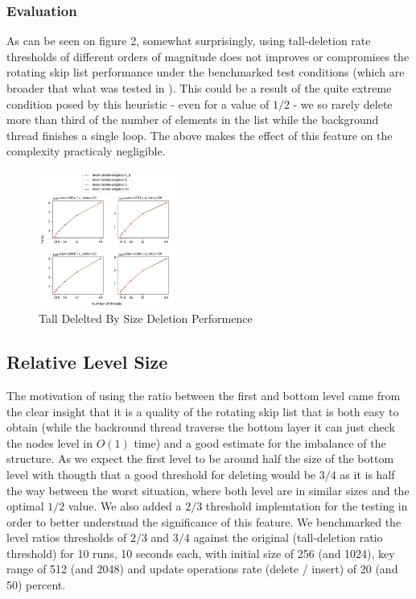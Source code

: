 \documentclass{article}
\begin{document}
\subsubsection{Evaluation}
\label{sssec:tds-evl}

As can be seen on figure 2, somewhat surprisingly, using tall-deletion rate thresholds of different orders of magnitude does not improves or compromises the rotating skip list performance under the benchmarked test conditions (which are broader that what was tested in \cite{C1}). This could be a result of the quite extreme condition posed by this heuristic - even for a value of $1/2$ - we so rarely delete more than third of the number of elements in the list while the background thread finishes a single loop. The above makes the effect of this feature on the complexity practicaly negligible. 

\begin{figure}
	\caption{Tall Delelted By Size Deletion Performence}
	\centering
	\includegraphics[width=0.4\textwidth]{level-delete-original_plot}
\end{figure}

\subsection{Relative Level Size}
\label{ssec:rls}

The motivation of using the ratio between the first and bottom level came from the clear insight that it is a quality of the rotating skip list that is both easy to obtain (while the backround thread traverse the bottom layer it can just check the nodes level in $O(1)$ time) and a good estimate for the imbalance of the structure. As we expect the first level to be around half the size of the bottom level with thougth that a good threshold for deleting would be $3/4$ as it is half the way between the worst situation, where both level are in similar sizes and the optimal $1/2$ value. We also added a $2/3$ threshold implemtation for the testing in order to better understnad the significance of this feature. We benchmarked the level ratios thresholds of $2/3$ and $3/4$ against the original (tall-deletion ratio threshold) for 10 runs, 10 seconds each, with initial size of 256 (and 1024), key range of 512 (and 2048) and update operations rate (delete / insert) of 20 (and 50) percent.
\end{document}
